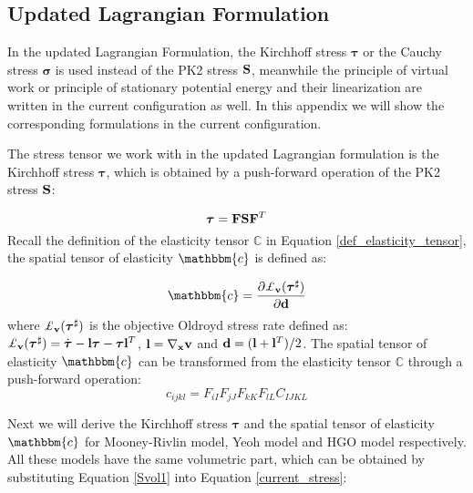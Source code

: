 \begin{appendices}
\section{Updated Lagrangian Formulation} \label{updated}
In the updated Lagrangian Formulation, the Kirchhoff stress $\boldsymbol{\tau}$ or the Cauchy stress $\boldsymbol{\sigma}$ is used instead of the PK2 stress $\bold{S}$, meanwhile the principle of virtual work or principle of stationary potential energy and their linearization are written in the current configuration as well. In this appendix we will show the corresponding formulations in the current configuration.

%
The stress tensor we work with in the updated Lagrangian formulation is the Kirchhoff stress $\boldsymbol{\tau}$, which is obtained by a push-forward operation of the PK2 stress $\bold{S}$:

\begin{equation}
\boldsymbol{\tau} = \bold{F}\bold{S}{\bold{F}}^T \label{current_stress}
\end{equation}
Recall the definition of the elasticity tensor $\mathbb{C}$ in Equation \ref{def_elasticity_tensor}, the spatial tensor of elasticity $\mathbbm{c}$ is defined as:

\begin{equation}
\mathbbm{c} = \frac{\partial{ \pounds_{\bold{v}}({\boldsymbol{\tau}}^{\sharp}) } }{\partial{ \bold{d} }}
\end{equation} 
where $\pounds_{\bold{v}}({\boldsymbol{\tau}}^{\sharp})$ is the objective Oldroyd stress rate defined as: $\pounds_{\bold{v}}({\boldsymbol{\tau}}^{\sharp}) = \dot{\boldsymbol{\tau}} - \bold{l}\boldsymbol{\tau} - \boldsymbol{\tau}\bold{l}^T$, $\bold{l} = \nabla_{\bold{x}}\bold{v}$ and $\bold{d} = (\bold{l} + {\bold{l}}^T)/2$. 
The spatial tensor of elasticity $\mathbbm{c}$ can be transformed from the elasticity tensor $\mathbb{C}$ through a push-forward operation:
\begin{equation}
c_{ijkl} = F_{iI}F_{jJ}F_{kK}F_{lL}C_{IJKL} \label{current_elasticity}
\end{equation}

Next we will derive the Kirchhoff stress $\boldsymbol{\tau}$ and the spatial tensor of elasticity $\mathbbm{c}$ for Mooney-Rivlin model, Yeoh model and HGO model respectively. All these models have the same volumetric part, which can be obtained by substituting Equation \ref{Svol1} into Equation \ref{current_stress}:


\end{appendices}
